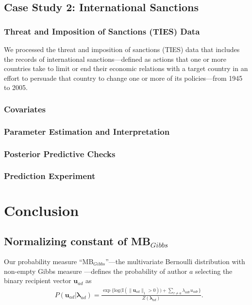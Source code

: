 \documentclass[12pt]{article}
\begin{document}
{\subsection{Case Study 2: International Sanctions}\label{subsec:International Sanctions}
\subsubsection{Threat and Imposition of Sanctions (TIES) Data}\label{subsubsec:TIES}
We processed the threat and imposition of sanctions (TIES) data \citep{morgan2014threat} that includes the records of international sanctions---defined as actions that one or more countries take to limit or end their economic relations with a target country in an effort to persuade that country to change one or more of its policies---from 1945 to 2005.
\subsubsection{Covariates}\label{subsec:Covariates_sanction}
\subsubsection{Parameter Estimation and Interpretation}\label{subsubsec:Result_sanction}
	\subsubsection{Posterior Predictive Checks}\label{subsubsec:PPC_sanction} 	 
		\subsubsection{Prediction Experiment}\label{subsubsec:Experiment_sanction}  
\section{Conclusion}\label{sec:conclusion}
\newpage


\begin{appendices}
\section{Normalizing constant of MB$_{Gibbs}$}\label{sec: non-empty Gibbs measure}
Our probability measure ``MB$_{Gibbs}$''---the multivariate Bernoulli distribution with non-empty Gibbs measure \citep{fellows2017removing}---defines the probability of author $a$ selecting the binary recipient vector $\boldsymbol{u}_{ad}$ as
\begin{equation*} 
\begin{aligned}
& P(\boldsymbol{u}_{ad}|\boldsymbol{\lambda}_{ad} ) = \frac{\exp\Big\{ \mbox{log}\big(\text{I}(\lVert \boldsymbol{u}_{ad} \rVert_1 > 0)\big) + \sum_{r \neq a} \lambda_{adr}u_{adr} \Big\}}{Z(\boldsymbol{\lambda}_{ad})}.
\end{aligned}
\end{equation*}


\end{appendices}}
\end{document}

